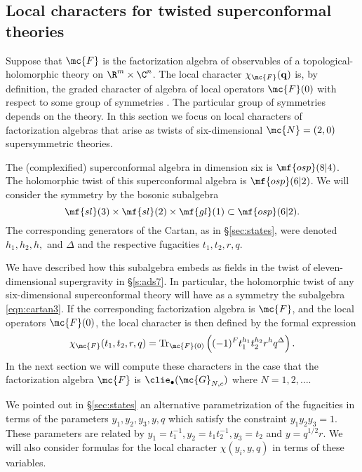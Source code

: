 %
%
%


\subsection{Local characters for twisted superconformal theories}\label{s:localchar}

Suppose that $\mc{F}$ is the factorization algebra of observables of a topological-holomorphic theory on $\R^m \times \C^n$. 
The local character $\chi_\mc{F} ({\bf q})$ is, by definition, the graded character of algebra of local operators $\mc{F}(0)$ with respect to some group of symmetries \cite{SWchar}.
The particular group of symmetries depends on the theory.
In this section we focus on local characters of factorization algebras that arise as twists of six-dimensional $\mc{N}=(2,0)$ supersymmetric theories.

The (complexified) superconformal algebra in dimension six is $\mf{osp}(8|4)$. 
The holomorphic twist of this superconformal algebra is $\mf{osp}(6|2)$. 
We will consider the symmetry by the bosonic subalgebra
\begin{equation}\label{eqn:cartan3}
\mf{sl}(3) \times \mf{sl}(2) \times \mf{gl}(1) \subset \mf{osp}(6|2)  .
\end{equation}
The corresponding generators of the Cartan, as in \S \ref{sec:states}, were denoted $h_1,h_2,h,$ and $\Delta$ and the respective fugacities $t_1,t_2,r,q$.

We have described how this subalgebra embeds as fields in the twist of eleven-dimensional supergravity in \S \ref{s:ads7}. 
In particular, the holomorphic twist of any six-dimensional superconformal theory will have as a symmetry the subalgebra \eqref{eqn:cartan3}.
If the corresponding factorization algebra is $\mc{F}$, and the local operators $\mc{F}(0)$, the local character is then defined by the formal expression
\begin{equation}
\chi_{\mc{F}}(t_1,t_2,r,q) = {\rm Tr}_{\mc{F}(0)} \left((-1)^F t_1^{h_1} t_2^{h_2} r^h q^\Delta\right) .
\end{equation}
In the next section we will compute these characters in the case that the factorization algebra $\mc{F}$ is $\clie_\bullet(\mc{G}_{N,c})$ where $N = 1,2,\ldots$.

We pointed out in \S \ref{sec:states} an alternative parametrization of the fugacities in terms of the parameters $y_1,y_2,y_3,y,q$ which satisfy the constraint $y_1 y_2 y_3 = 1$.
These parameters are related by $y_1=t_1^{-1}, y_2 = t_1 t_2^{-1}, y_3 = t_2$ and $y = q^{1/2} r$. 
We will also consider formulas for the local character $\chi(y_i,y,q)$ in terms of these variables.
  
